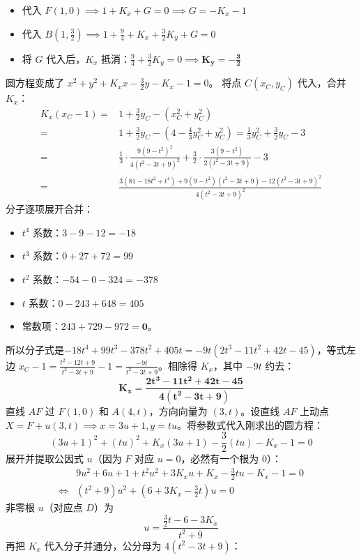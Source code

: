 \begin{solution}
\begin{itemize}
    \item 代入 $F(1,0) \implies 1 + K_x + G = 0 \implies G = -K_x - 1$
    \item 代入 $B(1, \frac{3}{2}) \implies 1 + \frac{9}{4} + K_x + \frac{3}{2}K_y + G = 0$
    \item 将 $G$ 代入后，$K_x$ 抵消：$\frac{9}{4} + \frac{3}{2}K_y = 0 \implies \mathbf{K_y = -\frac{3}{2}}$
\end{itemize}
圆方程变成了 $x^2 + y^2 + K_x x - \frac{3}{2}y - K_x - 1 = 0$。
将点 $C(x_C, y_C)$ 代入，合并 $K_x$：
\begin{align*}
K_x(x_C - 1) =& 1 + \frac{3}{2}y_C - (x_C^2 + y_C^2)\\
=&1 + \frac{3}{2}y_C - (4 - \frac{4}{3}y_C^2 + y_C^2) = \frac{1}{3}y_C^2 + \frac{3}{2}y_C - 3\\
=& \frac{1}{3} \cdot \frac{9(9-t^2)^2}{4(t^2-3t+9)^2} + \frac{3}{2} \cdot \frac{3(9-t^2)}{2(t^2-3t+9)} - 3\\
=&\frac{3(81 - 18t^2 + t^4) + 9(9-t^2)(t^2-3t+9) - 12(t^2-3t+9)^2}{4(t^2-3t+9)^2}
\end{align*}
分子逐项展开合并：
\begin{itemize}
\item $t^4$ 系数：$3 - 9 - 12 = -18$
\item $t^3$ 系数：$0 + 27 + 72 = 99$
\item $t^2$ 系数：$-54 - 0 - 324 = -378$
\item $t$ 系数：$0 - 243 + 648 = 405$
\item 常数项：$243 + 729 - 972 = \mathbf{0}$。
\end{itemize}
所以分子式是$-18t^4 + 99t^3 - 378t^2 + 405t = -9t(2t^3 - 11t^2 + 42t - 45)$，等式左边 $x_C - 1 = \frac{t^2 - 12t + 9}{t^2 - 3t + 9} - 1 = \frac{-9t}{t^2 - 3t + 9}$。相除得 $K_x$，其中 $-9t$ 约去：
$$\mathbf{K_x = \frac{2t^3 - 11t^2 + 42t - 45}{4(t^2 - 3t + 9)}}$$
直线 $AF$ 过 $F(1,0)$ 和 $A(4,t)$，方向向量为 $(3, t)$。设直线 $AF$ 上动点 $X = F + u(3, t) \implies x = 3u+1, y = tu$。将参数式代入刚求出的圆方程：
$$(3u+1)^2 + (tu)^2 + K_x(3u+1) - \frac{3}{2}(tu) - K_x - 1 = 0$$
展开并提取公因式 $u$（因为 $F$ 对应 $u=0$，必然有一个根为 0）：
\begin{align*}
&9u^2 + 6u + 1 + t^2 u^2 + 3K_x u + K_x - \frac{3}{2}tu - K_x - 1 = 0\\
\Leftrightarrow&(t^2 + 9)u^2 + \left( 6 + 3K_x - \frac{3}{2}t \right)u = 0
\end{align*}
非零根 $u$（对应点 $D$）为
$$u = \frac{\frac{3}{2}t - 6 - 3K_x}{t^2 + 9}$$
再把 $K_x$ 代入分子并通分，公分母为 $4(t^2 - 3t + 9)$：

\end{solution}
